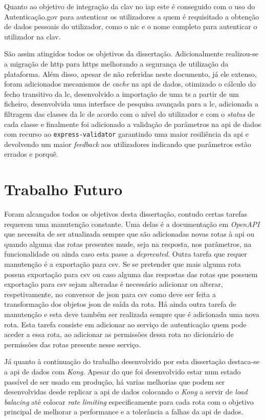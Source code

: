 Quanto ao objetivo de integração da \acrshort{clav} no \acrshort{iap} este é conseguido com o uso do Autenticação.gov para autenticar os utilizadores a quem é requisitado a obtenção de dados pessoais do utilizador, como o \acrshort{nic} e o nome completo para autenticar o utilizador na \acrshort{clav}.

São assim atingidos todos os objetivos da dissertação. Adicionalmente realizou-se a migração de \acrshort{http} para \acrshort{https} melhorando a segurança de utilização da plataforma. Além disso, apesar de não referidas neste documento, já ele extenso, foram adicionados mecanismos de \textit{cache} na \acrshort{api} de dados, otimizado o cálculo do fecho transitivo da \acrshort{lc}, desenvolvido a importação de uma \acrshort{ts} a partir de um ficheiro, desenvolvida uma interface de pesquisa avançada para a \acrshort{lc}, adicionada a filtragem das classes da \acrshort{lc} de acordo com o nível do utilizador e com o \textit{status} de cada classe e finalmente foi adicionado a validação de parâmetros na \acrshort{api} de dados com recurso ao \texttt{express-validator} garantindo uma maior resiliência da \acrshort{api} e devolvendo um maior \textit{feedback} aos utilizadores indicando que parâmetros estão errados e porquê.

\section{Trabalho Futuro}

Foram alcançados todos os objetivos desta dissertação, contudo certas tarefas requerem uma manutenção constante. Uma delas é a documentação em \textit{OpenAPI} que necessita de ser atualizada sempre que são adicionadas novas rotas à \acrshort{api} ou quando alguma das rotas presentes mude, seja na resposta, nos parâmetros, na funcionalidade ou ainda caso esta passe a \textit{deprecated}. Outra tarefa que requer manutenção é a exportação para \acrshort{csv}. Se se pretender que mais alguma rota possua exportação para \acrshort{csv} ou caso alguma das respostas das rotas que possuem exportação para \acrshort{csv} sejam alteradas é necessário adicionar ou alterar, respetivamente, no conversor de \acrshort{json} para \acrshort{csv} como deve ser feita a transformação dos objetos \acrshort{json} de saída da rota. Há ainda outra tarefa de manutenção e esta deve também ser realizada sempre que é adicionada uma nova rota. Esta tarefa consiste em adicionar ao serviço de autenticação quem pode aceder a essa rota, ao adicionar as permissões dessa rota no dicionário de permissões das rotas presente nesse serviço.

Já quanto à continuação do trabalho desenvolvido por esta dissertação destaca-se a \acrshort{api} de dados com \textit{Kong}. Apesar do que foi desenvolvido estar num estado passível de ser usado em produção, há varias melhorias que podem ser desenvolvidas desde replicar a \acrshort{api} de dados colocando o \textit{Kong} a servir de \textit{load balacing} até colocar \textit{rate limiting} especificamente para cada rota com o objetivo principal de melhorar a performance e a tolerância a falhas da \acrshort{api} de dados.
